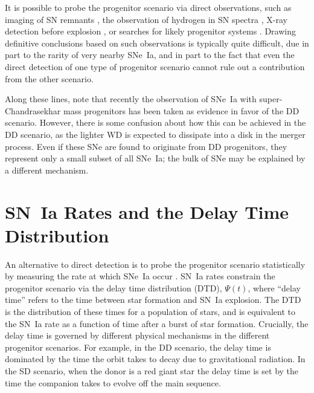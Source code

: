 It is possible to probe the progenitor scenario via direct
observations, such as imaging of SN
remnants \citep[e.g.,][]{ruizlapuente04a,ihara07a,maoz08a,gonzalez09a},
the observation of hydrogen in SN spectra \citep[e.g.,][]{livio03a},
X-ray detection before
explosion \citep[e.g.,][]{nelemans08a,roelofs08a,gilfanov10a}, or
searches for likely progenitor
systems \citep[e.g.,][]{geier07a,parthasarathy07a}. Drawing definitive
conclusions based on such observations is typically quite difficult,
due in part to the rarity of very nearby SNe~Ia, and in part to the
fact that even the direct detection of one type of progenitor scenario
cannot rule out a contribution from the other scenario.

Along these lines, note that recently the observation of SNe~Ia with
super-Chandrasekhar mass progenitors \citep{howell06a,scalzo10a} has
been taken as evidence in favor of the DD scenario. However, there is
some confusion about how this can be achieved in the DD scenario, as
the lighter WD is expected to dissipate into a disk in the merger
process. Even if these SNe are found to originate from DD progenitors,
they represent only a small subset of all SNe~Ia; the bulk of SNe may
be explained by a different mechanism.

\section{SN~Ia Rates and the Delay Time Distribution}

An alternative to direct detection is to probe the progenitor scenario
statistically by measuring the rate at which SNe~Ia occur
\citep[e.g.,][]{ruizlapuente95a,ruizlapuente98a,yungelson00a}.  SN~Ia
rates constrain the progenitor scenario via the delay time
distribution (DTD), $\Psi (t)$, where ``delay time'' refers to the time between
star formation and SN~Ia explosion. The DTD is the distribution of
these times for a population of stars, and is equivalent to the SN~Ia
rate as a function of time after a burst of star formation. Crucially,
the delay time is governed by different physical mechanisms in the
different progenitor scenarios. For example, in the DD scenario,
the delay time is dominated by the time the orbit takes to decay due to
gravitational radiation. In the SD scenario, when
the donor is a red giant star the delay time is set by the time the
companion takes to evolve off the main sequence. 

